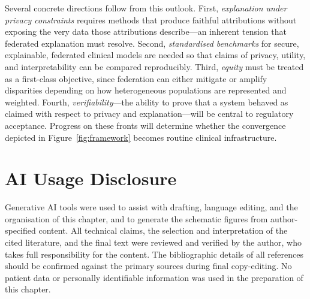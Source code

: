 \documentclass[11pt,a4paper]{article}
\begin{document}
Several concrete directions follow from this outlook. First, \emph{explanation
under privacy constraints} requires methods that produce faithful attributions
without exposing the very data those attributions describe---an inherent tension
that federated explanation must resolve. Second, \emph{standardised benchmarks}
for secure, explainable, federated clinical models are needed so that claims of
privacy, utility, and interpretability can be compared reproducibly. Third,
\emph{equity} must be treated as a first-class objective, since federation can
either mitigate or amplify disparities depending on how heterogeneous
populations are represented and weighted. Fourth, \emph{verifiability}---the
ability to prove that a system behaved as claimed with respect to privacy and
explanation---will be central to regulatory acceptance. Progress on these fronts
will determine whether the convergence depicted in Figure~\ref{fig:framework}
becomes routine clinical infrastructure.

\section*{AI Usage Disclosure}
Generative AI tools were used to assist with drafting, language editing, and the
organisation of this chapter, and to generate the schematic figures from
author-specified content. All technical claims, the selection and interpretation
of the cited literature, and the final text were reviewed and verified by the
author, who takes full responsibility for the content. The bibliographic details
of all references should be confirmed against the primary sources during final
copy-editing. No patient data or personally identifiable information was used in
the preparation of this chapter.

\end{document}
